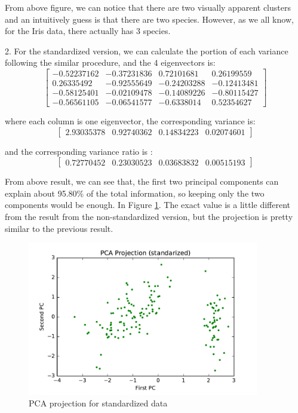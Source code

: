\begin{description}
From above figure, we can notice that there are two visually apparent clusters and an intuitively guess is that there are two species. However, as we all know, for the Iris data, there actually has 3 species.\\

\item{2. }
For the standardized version, we can calculate the portion of each variance following the similar procedure, and the 4 eigenvectors is:
$$
\begin{bmatrix}
 -0.52237162 & -0.37231836 &  0.72101681 &  0.26199559 \\
  0.26335492 & -0.92555649 & -0.24203288 & -0.12413481 \\
 -0.58125401 & -0.02109478 & -0.14089226 & -0.80115427 \\
 -0.56561105 & -0.06541577 & -0.6338014  &  0.52354627
\end{bmatrix}
$$ 

where each column is one eigenvector, the corresponding variance is:
$$\begin{bmatrix}
2.93035378 & 0.92740362 & 0.14834223 & 0.02074601
\end{bmatrix}$$

and the corresponding variance ratio is :
$$\begin{bmatrix}
0.72770452 & 0.23030523 & 0.03683832 & 0.00515193
\end{bmatrix}$$

From above result, we can see that, the first two principal components can explain about 95.80\% of the total information, so keeping only the two components would be enough. In Figure \ref{fig:pca_2}. The exact value is a little different from the result from the non-standardized version, but the projection is pretty similar to the previous result.

\begin{figure}[H]
\centering
\includegraphics[width=0.9\textwidth]{./figures/projection2.pdf}
\caption{\label{fig:pca_2} PCA projection for standardized data}
\end{figure}

\end{description}

